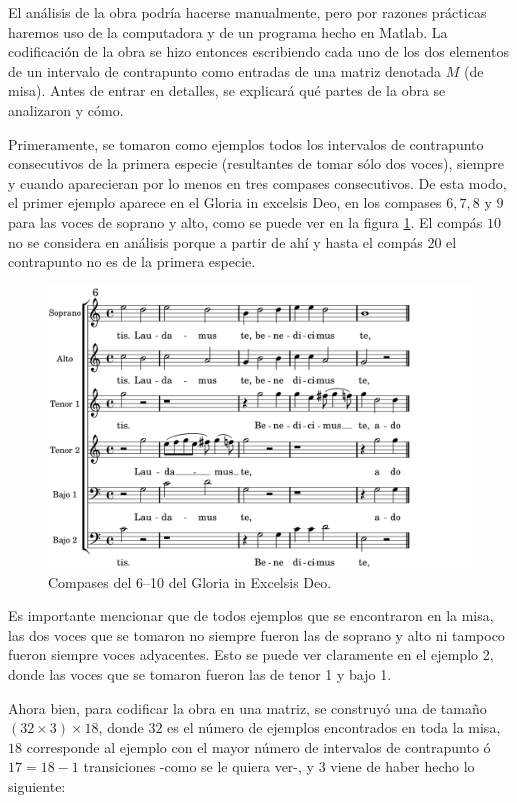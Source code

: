 \documentclass[letterpaper,12pt]{book}
\theoremstyle{definition} \newtheorem{Def}{Definición}[chapter]
\theoremstyle{definition} \newtheorem{Teo}{Teorema}[chapter]
\theoremstyle{definition} \newtheorem{Pro}{Proposición}[chapter]
\theoremstyle{definition} \newtheorem{Lema}{Lema}[chapter]
\begin{document}
El análisis de la obra podría hacerse manualmente, pero por razones prácticas haremos uso de la computadora y de un programa hecho en Matlab. La codificación de la obra se hizo entonces escribiendo cada uno de los dos elementos de un intervalo de contrapunto como entradas de una matriz denotada $M$ (de misa). Antes de entrar en detalles, se explicará qué partes de la obra se analizaron y cómo. 

Primeramente, se tomaron como ejemplos todos los intervalos de contrapunto consecutivos de la primera especie (resultantes de tomar sólo dos voces), siempre y cuando aparecieran por lo menos en tres compases consecutivos. De esta modo, el primer ejemplo aparece en el Gloria in excelsis Deo, en los compases $6, 7, 8$ y $9$ para las voces de soprano y alto, como se puede ver en la figura \ref{Ejemplo1}. El compás $10$ no se considera en análisis porque a partir de ahí y hasta el compás $20$ el contrapunto no es de la primera especie. 

\begin{figure}[h]
\centering
\includegraphics[angle=0, width=1\textwidth]{Ejemplo1.png}
\caption{\label{Ejemplo1}Compases del 6--10 del Gloria in Excelsis Deo.}
\end{figure}

Es importante mencionar que de todos ejemplos que se encontraron en la misa, las dos voces que se tomaron no siempre fueron las de soprano y alto ni tampoco fueron siempre voces adyacentes. Esto se puede ver claramente en el ejemplo 2, donde las voces que se tomaron fueron las de tenor 1 y bajo 1. 

Ahora bien, para codificar la obra en una matriz, se construyó una de tamaño $(32 \times 3) \times 18$, donde $32$ es el número de ejemplos encontrados en toda la misa, $18$ corresponde al ejemplo con el mayor número de intervalos de contrapunto ó $17=18-1$ transiciones -como se le quiera ver-, y $3$ viene de haber hecho lo siguiente: 
\end{document}
